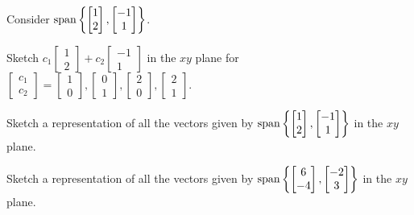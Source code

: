 \begin{applicationActivities}{2}{8}
\begin{activity}{10}
  Consider \(\operatorname{span}\left\{\begin{bmatrix}1\\2\end{bmatrix},
  \begin{bmatrix}-1\\1\end{bmatrix}\right\}\).
  \begin{subactivity}
    Sketch
    \(c_1\begin{bmatrix}1\\2\end{bmatrix}+
    c_2\begin{bmatrix}-1\\1\end{bmatrix}\) in the \(xy\) plane
    for \(\begin{bmatrix}c_1\\c_2\end{bmatrix}=
    \begin{bmatrix}1\\0\end{bmatrix},
    \begin{bmatrix}0\\1\end{bmatrix},
    \begin{bmatrix}2\\0\end{bmatrix},
    \begin{bmatrix}2\\1\end{bmatrix}\).
  \end{subactivity}
  \begin{subactivity}
    Sketch a representation of all the vectors given by
    \(\operatorname{span}\left\{\begin{bmatrix}1\\2\end{bmatrix},
     \begin{bmatrix}-1\\1\end{bmatrix}\right\}\)
    in the \(xy\) plane.
  \end{subactivity}
\end{activity}

\begin{activity}{5}
    Sketch a representation of all the vectors given by
    \(\operatorname{span}\left\{\begin{bmatrix}6\\-4\end{bmatrix},
     \begin{bmatrix}-2\\3\end{bmatrix}\right\}\)
    in the \(xy\) plane.
\end{activity}


\end{applicationActivities}
